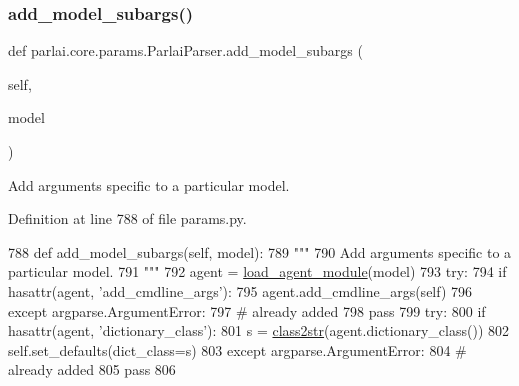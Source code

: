 \subsubsection{\texorpdfstring{add\+\_\+model\+\_\+subargs()}{add\_model\_subargs()}}
{\footnotesize\ttfamily def parlai.\+core.\+params.\+Parlai\+Parser.\+add\+\_\+model\+\_\+subargs (\begin{DoxyParamCaption}\item[{}]{self,  }\item[{}]{model }\end{DoxyParamCaption})}

\begin{DoxyVerb}Add arguments specific to a particular model.
\end{DoxyVerb}
 

Definition at line 788 of file params.\+py.


\begin{DoxyCode}
788     \textcolor{keyword}{def }add\_model\_subargs(self, model):
789         \textcolor{stringliteral}{"""}
790 \textcolor{stringliteral}{        Add arguments specific to a particular model.}
791 \textcolor{stringliteral}{        """}
792         agent = \hyperlink{namespaceparlai_1_1core_1_1loader_a8e6a8f524cba24b80e9bd157c2e0ab8b}{load\_agent\_module}(model)
793         \textcolor{keywordflow}{try}:
794             \textcolor{keywordflow}{if} hasattr(agent, \textcolor{stringliteral}{'add\_cmdline\_args'}):
795                 agent.add\_cmdline\_args(self)
796         \textcolor{keywordflow}{except} argparse.ArgumentError:
797             \textcolor{comment}{# already added}
798             \textcolor{keywordflow}{pass}
799         \textcolor{keywordflow}{try}:
800             \textcolor{keywordflow}{if} hasattr(agent, \textcolor{stringliteral}{'dictionary\_class'}):
801                 s = \hyperlink{namespaceparlai_1_1core_1_1params_a4abab85fb7a745de31fcc73de5840a60}{class2str}(agent.dictionary\_class())
802                 self.set\_defaults(dict\_class=s)
803         \textcolor{keywordflow}{except} argparse.ArgumentError:
804             \textcolor{comment}{# already added}
805             \textcolor{keywordflow}{pass}
806 
\end{DoxyCode}
\mbox{\label{classparlai_1_1core_1_1params_1_1ParlaiParser_a6043b5b5c36f99f85a9791dd8dc35551}} 
